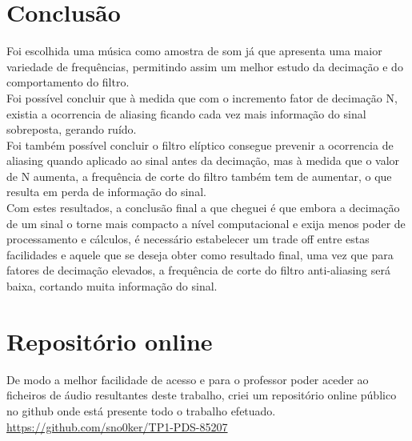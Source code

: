 \documentclass[11pt]{article}
\begin{document}
\section{Conclusão}
Foi escolhida uma música como amostra de som já que apresenta uma maior variedade de frequências, permitindo assim um melhor estudo da decimação e do comportamento do filtro. \\
Foi possível concluir que à medida que com o incremento fator de decimação N, existia a ocorrencia de aliasing ficando cada vez mais informação do sinal sobreposta, gerando ruído.\\ Foi também possível concluir o filtro elíptico consegue prevenir a ocorrencia de aliasing quando aplicado ao sinal antes da decimação, mas à medida que o valor de N aumenta, a frequência de corte do filtro também tem de aumentar, o que resulta em perda de informação do sinal.\\
\newline
Com estes resultados, a conclusão final a que cheguei é que embora a decimação de um sinal o torne mais compacto a nível computacional e exija menos poder de processamento e cálculos, é necessário estabelecer um trade off entre estas facilidades e aquele que se deseja obter como resultado final, uma vez que para fatores de decimação elevados, a frequência de corte do filtro anti-aliasing será baixa, cortando muita informação do sinal.

\section{Repositório online}
De modo a melhor facilidade de acesso e para o professor poder aceder ao ficheiros de áudio resultantes deste trabalho, criei um repositório online público no github onde está presente todo o trabalho efetuado.
\newline
\href{https://github.com/sno0ker/TP1-PDS-85207}{https://github.com/sno0ker/TP1-PDS-85207}
\end{document}
